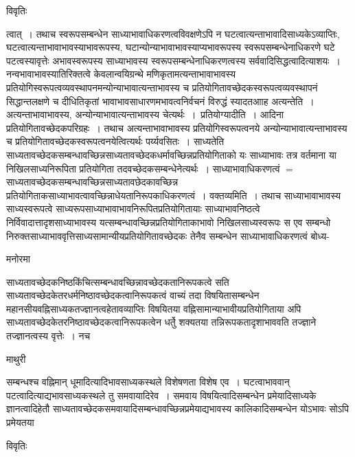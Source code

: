 \documentclass[10pt, openany]{book}
\begin{document}
{\begin{center}     विवृतिः \end{center}
त्वात्~। तथाच स्वरूपसम्बन्धेन साध्याभावाधिकरणत्वविवक्षणेऽपि न घटत्वात्यन्ताभावादिसाध्यकेऽव्याप्तिः,  घटत्वात्यन्ताभावाभावस्याभावरूपस्य, घटान्योन्याभावाभावस्याप्यभावरूपस्य स्वरूपसम्बन्धेनाधिकरणे घटे पटत्वस्यावृत्तेः अभावस्वरूपस्य साध्याभावस्य स्वरूपसम्बन्धेनाधिकरणत्वस्य सर्ववादिसिद्धत्वादित्याशयः~। नन्वभावाभावस्यातिरिक्तत्वे केवलान्वयिग्रन्थे मणिकृतामत्यन्ताभावाभावस्य प्रतियोगिस्वरूपत्वव्यवस्थापनमन्योन्याभावात्यन्ताभावस्य
च प्रतियोगितावच्छेदकस्वरूपत्वव्यवस्थापनं सिद्धान्तलक्षणे च दीधितिकृतां भावाभावसाधारणमभावत्वनिर्वचनं विरुद्धं स्यादतआाह अत्यन्तेति~।  अत्यन्ताभावाभावस्य, अन्योन्याभावात्यन्ताभावस्य चेत्यर्थः~।~प्रतियोग्यादीति~। आदिना प्रतियोगितावच्छेदकपरिग्रहः~।  तथाच अत्यन्ताभावाभावस्य प्रतियोगिस्वरूपत्वनये अन्योन्याभावात्यन्ताभावस्य च प्रतियोगितावच्छेदकस्वरूपत्वनयेत्वित्यर्थः पर्य्यवसितः~। {\la साध्यतेति~ }साध्यतावच्छेदकसम्बन्धावच्छिन्नसाध्यतावच्छेदकधर्मावच्छिन्नप्रतियोगिताको यः साध्याभावः तत्र वर्तमाना या निखिलसाध्यनिरूपिता प्रतियोगिता तदवच्छेदकसम्बन्धेनेत्यर्थः~।
साध्याभावाधिकरणत्वं $=$ साध्यतावच्छेदकसम्बन्धावच्छिन्नसाध्यतावछेदकावच्छिन्न प्रतियोगिताकसाध्याभावत्वावच्छिन्नाधेयतानिरूपकाधिकरणत्वं~। वक्तव्यमिति~। तथाच साध्याभावाभावस्य साध्यस्वरूपत्वे साध्यरूपसाध्याभावाभावनिरूपितप्रतियोगितायाः साध्याभावनिष्ठत्वे निर्विवादात्तादृशसाध्याभावस्य यत्सम्बन्धावच्छिन्नप्रतियोगिताकाभावो निखिलसाध्यस्वरूपः स एव सम्बन्धो निरुक्तसाध्याभाववृत्तिसाध्यसामान्यीयप्रतियोगितावच्छेदकः तेनैव सम्बन्धेन साध्याभावाधिकरणत्वं बोध्य-
\begin{center}   मनोरमा  \end{center}
साध्यतावच्छेदकनिष्ठकिंचित्सम्बन्धावच्छिन्नावच्छेदकतानिरूपकत्वे सति साध्यतावच्छेदकेतरधर्मनिष्ठावच्छेदकत्वानिरूपकत्वं वाच्यं तदा विषयितासम्बन्धेन महानसीयवह्निसाध्यकतज्ज्ञानत्वहेतावव्याप्तिः विषयितया वह्निसामान्याभावीयप्रतियोगिताया अपि साध्यतावच्छेदकेतरनिष्ठावच्छेदकत्वानिरूपकत्वेन धर्तेु  शक्यतया तन्निरूपकतादृशाभाववति तज्ज्ञाने तज्ज्ञानत्वस्य वृत्तेः~। नच
\newpage
\begin{center}  माथुरी  \end{center}
{\la सम्बन्धश्च वह्निमान् धूमादित्यादिभावसाध्यकस्थले विशेषणता  विशेष एव~। घटत्वाभाववान् पटत्वादित्याद्यभावसाध्यकस्थले तु समवायादिरेव~। समवाय विषयित्वादिसम्बन्धेन प्रमेयादिसाध्यके ज्ञानत्वादिहेतौ साध्यतावच्छेदकसमवायादिसम्बन्धावच्छिन्नप्रमेयाद्यभावस्य कालिकादिसम्बन्धेन योऽभावः सोऽपि प्रमेयतया}
\begin{center}     विवृतिः \end{center}
}
\end{document}
